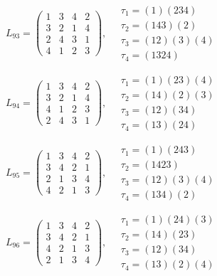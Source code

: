 $L_{93} = \begin{pmatrix} 1 & 3 & 4 & 2 \\ 3 & 2 & 1 & 4 \\ 2 & 4 & 3 & 1 \\ 4 & 1 & 2 & 3 \end{pmatrix}, \quad \begin{matrix} \tau_{1} = (1)(2 3 4) \\ \tau_{2} = (1 4 3)(2) \\ \tau_{3} = (1 2)(3)(4) \\ \tau_{4} = (1 3 2 4) \end{matrix}$

$L_{94} = \begin{pmatrix} 1 & 3 & 4 & 2 \\ 3 & 2 & 1 & 4 \\ 4 & 1 & 2 & 3 \\ 2 & 4 & 3 & 1 \end{pmatrix}, \quad \begin{matrix} \tau_{1} = (1)(2 3)(4) \\ \tau_{2} = (1 4)(2)(3) \\ \tau_{3} = (1 2)(3 4) \\ \tau_{4} = (1 3)(2 4) \end{matrix}$

$L_{95} = \begin{pmatrix} 1 & 3 & 4 & 2 \\ 3 & 4 & 2 & 1 \\ 2 & 1 & 3 & 4 \\ 4 & 2 & 1 & 3 \end{pmatrix}, \quad \begin{matrix} \tau_{1} = (1)(2 4 3) \\ \tau_{2} = (1 4 2 3) \\ \tau_{3} = (1 2)(3)(4) \\ \tau_{4} = (1 3 4)(2) \end{matrix}$

$L_{96} = \begin{pmatrix} 1 & 3 & 4 & 2 \\ 3 & 4 & 2 & 1 \\ 4 & 2 & 1 & 3 \\ 2 & 1 & 3 & 4 \end{pmatrix}, \quad \begin{matrix} \tau_{1} = (1)(2 4)(3) \\ \tau_{2} = (1 4)(2 3) \\ \tau_{3} = (1 2)(3 4) \\ \tau_{4} = (1 3)(2)(4) \end{matrix}$

